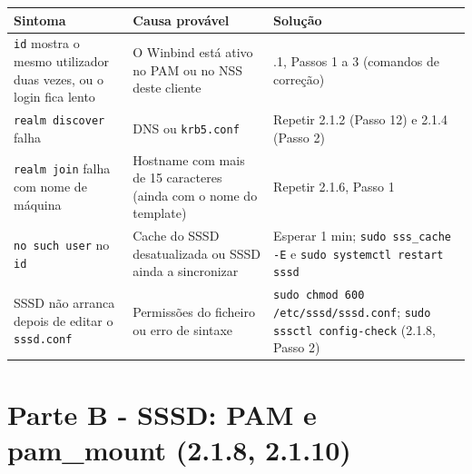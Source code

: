 \begin{center}\small
\begin{tabularx}{\linewidth}{|>{\raggedright\arraybackslash}X|>{\raggedright\arraybackslash}X|>{\raggedright\arraybackslash}X|}
\hline
\rowcolor{azul!10}\textbf{Sintoma} & \textbf{Causa provável} & \textbf{Solução} \\
\hline
\texttt{id} mostra o mesmo utilizador duas vezes, ou o login fica lento & O Winbind está ativo no PAM ou no NSS deste cliente & 2.1.1, Passos 1 a 3 (comandos de correção) \\
\hline
\texttt{realm discover} falha & DNS ou \texttt{krb5.conf} & Repetir 2.1.2 (Passo 12) e 2.1.4 (Passo 2) \\
\hline
\texttt{realm join} falha com nome de máquina & Hostname com mais de 15 caracteres (ainda com o nome do template) & Repetir 2.1.6, Passo 1 \\
\hline
\texttt{no such user} no \texttt{id} & Cache do SSSD desatualizada ou SSSD ainda a sincronizar & Esperar 1 min; \texttt{sudo sss\_cache -E} e \texttt{sudo systemctl restart sssd} \\
\hline
SSSD não arranca depois de editar o \texttt{sssd.conf} & Permissões do ficheiro ou erro de sintaxe & \texttt{sudo chmod 600 /\allowbreak{}etc/\allowbreak{}sssd/\allowbreak{}sssd.conf}; \texttt{sudo sssctl config-check} (2.1.8, Passo 2) \\
\hline
\end{tabularx}
\end{center}

\label{ec-b1-pam}

\section*{Parte B - SSSD: PAM e pam\_mount (2.1.8, 2.1.10)}

